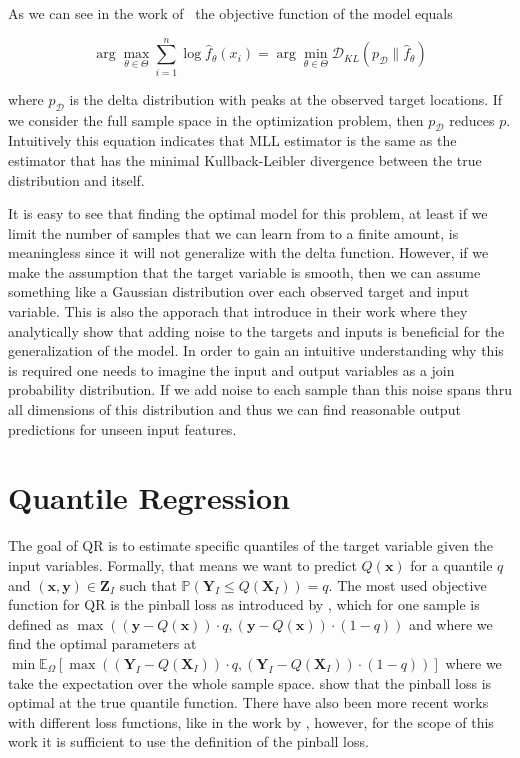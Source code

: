 As we can see in the work of~\cite{rothfuss2019noise} the objective function of the model equals

\begin{equation}
    \arg \max _{\theta \in \Theta} \sum_{i=1}^n \log
    \hat{f}_\theta\left(x_i\right)=\arg \min _{\theta \in \Theta}
    \mathcal{D}_{K
        L}\left(p_{\mathcal{D}} \| \hat{f}_\theta\right)
\end{equation}

where $p_{\mathcal{D}}$ is the delta distribution with peaks at the observed target locations. If we consider the full sample space in the optimization problem, then $p_{\mathcal{D}}$ reduces $p$. Intuitively this equation indicates that MLL estimator is the same as the estimator that has the minimal Kullback-Leibler divergence between the true distribution and itself.

It is easy to see that finding the optimal model for this problem, at least if we limit the number of samples that we can learn from to a finite amount, is meaningless since it will not generalize with the delta function. However, if we make the assumption that the target variable is smooth, then we can assume something like a Gaussian distribution over each observed target and input variable. This is also the apporach that \cite{rothfuss2019noise} introduce in their work where they analytically show that adding noise to the targets and inputs is beneficial for the generalization of the model. In order to gain an intuitive understanding why this is required one needs to imagine the input and output variables as a join probability distribution. If we add noise to each sample than this noise spans thru all dimensions of this distribution and thus we can find reasonable output predictions for unseen input features. %

\section{Quantile Regression}\label{sec:qr}

The goal of QR is to estimate specific quantiles of the target variable given the input variables. Formally, that means we want to predict $Q(\mathbf{x})$ for a quantile $q$ and $(\mathbf{x}, \mathbf{y})\in\mathbf{Z}_I$ such that $\mathbb{P}(\mathbf{Y}_I \leq Q(\mathbf{X}_I)) = q$. The most used objective function for QR is the pinball loss as introduced by \cite{koenker1978regression}, which for one sample is defined as $\max ((\mathbf{y} - Q(\mathbf{x})) \cdot q, (\mathbf{y} - Q(\mathbf{x})) \cdot (1 - q))$ and where we find the optimal parameters at $ \min \mathbb{E}_{\Omega}\left[ \max \left((\mathbf{Y}_I - Q(\mathbf{X}_I)) \cdot q, (\mathbf{Y}_I - Q(\mathbf{X}_I)) \cdot (1 - q)\right)\right]$ where we take the expectation over the whole sample space. \cite{koenker1978regression} show that the pinball loss is optimal at the true quantile function. There have also been more recent works with different loss functions, like in the work by \cite{chung2021beyond}, however, for the scope of this work it is sufficient to use the definition of the pinball loss.

